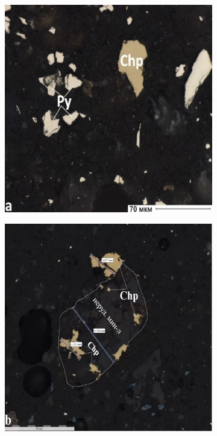 \begin{figure}[H]
    \centering
    \begin{subfigure}[b]{0.45\textwidth}
        \centering
        \includegraphics[width=\textwidth]{assets/296}
    \end{subfigure}
    \begin{subfigure}[b]{0.45\textwidth}
        \centering
        \includegraphics[width=\textwidth]{assets/297}

\end{subfigure}
\end{figure}

